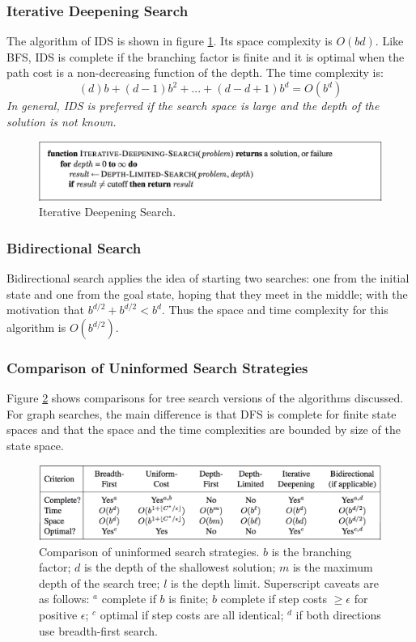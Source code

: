 \documentclass[twoside]{article}
\begin{document}
\subsubsection{Iterative Deepening Search}
The algorithm of IDS is shown in figure \ref{fig:ids}. Its space complexity
is \(O(bd)\). Like BFS, IDS is complete if the branching factor is finite and
it is optimal when the path cost is a non-decreasing function of the depth.
The time complexity is:
\begin{equation}
    (d)b + (d - 1)b^2 + ... + (d - d + 1)b^d = O(b^d)
\end{equation}
\emph{In general, IDS is preferred if the search space is large and the depth
of the solution is not known.}
\begin{figure}
  \includegraphics[width=\linewidth]{ids.png}
  \caption{Iterative Deepening Search.}
  \label{fig:ids}
\end{figure}
\subsubsection{Bidirectional Search}
Bidirectional search applies the idea of starting two searches: one from the
initial state and one from the goal state, hoping that they meet in the middle;
with the motivation that \(b^{d/2} + b^{d/2} < b^d\). Thus the space and time
complexity for this algorithm is \(O(b^{d/2})\).
\subsubsection{Comparison of Uninformed Search Strategies}
Figure \ref{fig:comparison} shows comparisons for tree search versions of the 
algorithms discussed. For graph searches, the main difference is that DFS is
complete for finite state spaces and that the space and the time complexities
are bounded by size of the state space.
\begin{figure}
  \includegraphics[width=\linewidth]{comparison.png}
  \caption{Comparison of uninformed search strategies. \(b\) is the branching 
  factor; \(d\) is the depth of the shallowest solution; \(m\) is the maximum depth 
  of the search tree; \(l\) is the depth limit. Superscript caveats are as follows:
  \(^a\) complete if \(b\) is finite; \(b\) complete if step costs \(\geq \epsilon\)
   for positive \(\epsilon\); \(^c\) optimal if step costs are all identical; 
  \(^d\) if both directions use breadth-first search.}
  \label{fig:comparison}
\end{figure}
\end{document}
